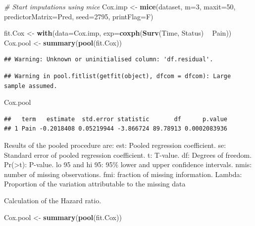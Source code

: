 \documentclass[
]{book}
\newenvironment{Shaded}{\begin{snugshade}}{\end{snugshade}}
\newcommand{\CommentTok}[1]{\textcolor[rgb]{0.56,0.35,0.01}{\textit{#1}}}
\newcommand{\DataTypeTok}[1]{\textcolor[rgb]{0.13,0.29,0.53}{#1}}
\newcommand{\DecValTok}[1]{\textcolor[rgb]{0.00,0.00,0.81}{#1}}
\newcommand{\KeywordTok}[1]{\textcolor[rgb]{0.13,0.29,0.53}{\textbf{#1}}}
\newcommand{\NormalTok}[1]{#1}
\newcommand{\OperatorTok}[1]{\textcolor[rgb]{0.81,0.36,0.00}{\textbf{#1}}}
\newcommand{\StringTok}[1]{\textcolor[rgb]{0.31,0.60,0.02}{#1}}
\begin{document}
\begin{Shaded}
\begin{Highlighting}[]
\CommentTok{# Start imputations using mice}
\NormalTok{Cox.imp <-}\StringTok{ }\KeywordTok{mice}\NormalTok{(dataset, }\DataTypeTok{m=}\DecValTok{3}\NormalTok{, }\DataTypeTok{maxit=}\DecValTok{50}\NormalTok{, }\DataTypeTok{predictorMatrix=}\NormalTok{Pred, }\DataTypeTok{seed=}\DecValTok{2795}\NormalTok{, }\DataTypeTok{printFlag=}\NormalTok{F)}

\NormalTok{fit.Cox <-}\StringTok{ }\KeywordTok{with}\NormalTok{(}\DataTypeTok{data=}\NormalTok{Cox.imp, }\DataTypeTok{exp=}\KeywordTok{coxph}\NormalTok{(}\KeywordTok{Surv}\NormalTok{(Time, Status) }\OperatorTok{~}\StringTok{ }\NormalTok{Pain))}
\NormalTok{Cox.pool <-}\StringTok{ }\KeywordTok{summary}\NormalTok{(}\KeywordTok{pool}\NormalTok{(fit.Cox))}
\end{Highlighting}
\end{Shaded}

\begin{verbatim}
## Warning: Unknown or uninitialised column: 'df.residual'.
\end{verbatim}

\begin{verbatim}
## Warning in pool.fitlist(getfit(object), dfcom = dfcom): Large sample assumed.
\end{verbatim}

\begin{Shaded}
\begin{Highlighting}[]
\NormalTok{Cox.pool}
\end{Highlighting}
\end{Shaded}

\begin{verbatim}
##   term   estimate  std.error statistic       df      p.value
## 1 Pain -0.2018408 0.05219944 -3.866724 89.78913 0.0002083936
\end{verbatim}

Results of the pooled procedure are: est: Pooled regression coefficient.
se: Standard error of pooled regression coefficient. t: T-value. df:
Degrees of freedom. Pr(\textgreater\textbar t\textbar): P-value. lo 95
and hi 95: 95\% lower and upper confidence intervals. nmis: number of
missing observations. fmi: fraction of missing information. Lambda:
Proportion of the variation attributable to the missing data

Calculation of the Hazard ratio.

\begin{Shaded}
\begin{Highlighting}[]
\NormalTok{Cox.pool <-}\StringTok{ }\KeywordTok{summary}\NormalTok{(}\KeywordTok{pool}\NormalTok{(fit.Cox))}
\end{Highlighting}
\end{Shaded}
\end{document}
